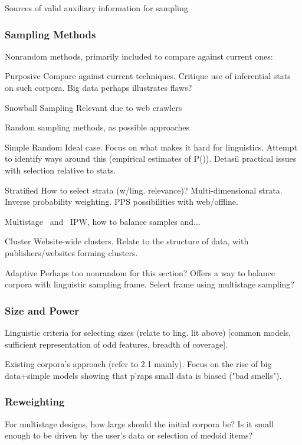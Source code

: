 Sources of valid auxiliary information for sampling
\subsubsection{Sampling Methods}
Nonrandom methods, primarily included to compare against current ones:
\begin{itemizeTitle}
    \item[Purposive] Compare against current techniques.  Critique use of inferential stats on such corpora.  Big data perhaps illustrates flaws?
    \item[Snowball Sampling] Relevant due to web crawlers
\end{itemizeTitle}
Random sampling methods, as possible approaches
\begin{itemizeTitle}
    \item[Simple Random] Ideal case.  Focus on what makes it hard for linguistics.  Attempt to identify ways around this (empirical estimates of P()). Detasil practical issues with selection relative to stats.  
    \item[Stratified] How to select strata (w/ling. relevance)? Multi-dimensional strata. Inverse probability weighting.  PPS possibilities with web/offline.
    \item[Multistage ~and~] IPW, how to balance samples and...
    \item[Cluster] Website-wide clusters.  Relate to the structure of data, with publishers/websites forming clusters.
    \item[Adaptive] Perhaps too nonrandom for this section?  Offers a way to balance corpora with linguistic sampling frame.  Select frame using multistage sampling?
\end{itemizeTitle}

\subsubsection{Size and Power}
Linguistic criteria for selecting sizes (relate to ling. lit above) [common models, sufficient representation of odd features, breadth of coverage].

Existing corpora's approach (refer to 2.1 mainly).  Focus on the rise of big data+simple models showing that p'raps small data is biased ("bad smells").
\subsubsection{Reweighting}
For multistage designs, how large should the initial corpora be? Is it small enough to be driven by the user's data or selection of medoid items?

